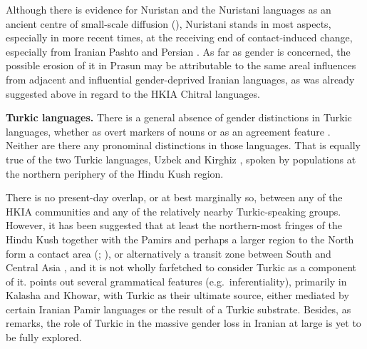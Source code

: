 \documentclass[output=collectionpaper]{langsci/langscibook}
\begin{document}
Although there is evidence for Nuristan and the Nuristani languages as an ancient centre of small-scale diffusion (\citealt{Liljegren2017a}), Nuristani stands in most aspects, especially in more recent times, at the receiving end of contact-induced change, especially from Iranian Pashto and Persian \citep[103]{Degener2002}. As far as gender is concerned, the possible erosion of it in Prasun may be attributable to the same areal influences from adjacent and influential gender\hyp{}deprived Iranian languages, as was already suggested above in regard to the HKIA Chitral languages.

\textbf{Turkic languages.} There is a general absence of gender distinctions in Turkic languages, whether as overt markers of nouns or as an agreement feature \citep[530]{Kornfilt2009}. Neither are there any pronominal distinctions in those languages. That is equally true of the two Turkic languages, Uzbek \citep{Boeschoten1998} and Kirghiz \citep{Kirchner1998}, spoken by populations at the northern periphery of the Hindu Kush region.

There is no present-day overlap, or at best marginally so, between any of the HKIA communities and any of the relatively nearby Turkic-speaking groups. However, it has been suggested that at least the northern-most fringes of the Hindu Kush together with the Pamirs and perhaps a larger region to the North form a contact area (\citealt{Edelman1980}; \citealt[423]{Payne1989}), or alternatively a transit zone between South and Central Asia \citep[253]{Tikkanen2008}, and it is not wholly farfetched to consider Turkic as a component of it. \citet[402--421]{Bashir1988} points out several grammatical features (e.g.\ inferentiality), primarily in Kalasha and Khowar, with Turkic as their ultimate source, either mediated by certain Iranian Pamir languages or the result of a Turkic substrate. Besides, as \citet[104]{Johanson2013} remarks, the role of Turkic in the massive gender loss in Iranian at large is yet to be fully explored.
\end{document}
